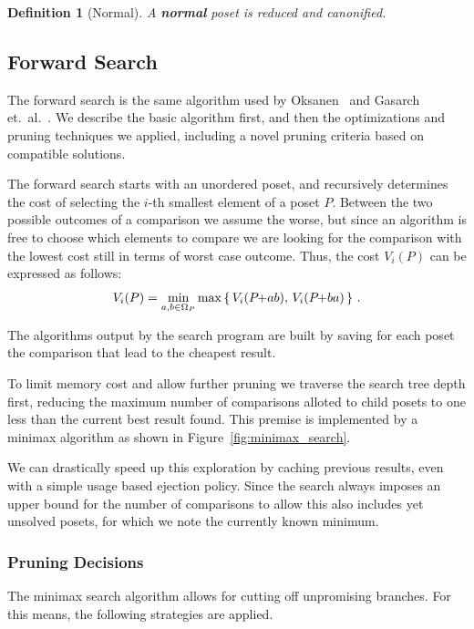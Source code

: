 \documentclass[twoside,leqno,twocolumn]{article}
\newcommand{\pchild}[3]{{#1}\kern-1pt{+}{#2}{#3}}
\newtheorem{definition}{Definition}[section]
\begin{document}
\begin{definition}[Normal]
  A \textbf{normal} poset is reduced and canonified.
\end{definition}


\subsection{Forward Search}\label{chapter:forward_search}
The forward search is the same algorithm used by Oksanen~\cite{Oksanen2006} and Gasarch et.\ al\@.~\cite{Gasarch1996}.
We describe the basic algorithm first, and then the optimizations and pruning techniques we applied, including a novel pruning criteria based on compatible solutions.

The forward search starts with an unordered poset, and recursively determines the cost of selecting the $i$-th smallest element of a poset $P$.
Between the two possible outcomes of a comparison we assume the worse, but since an algorithm is free to choose which elements to compare we are looking for the comparison with the lowest cost still in terms of worst case outcome.
Thus, the cost $V_i(P)$ can be expressed as follows:
\begin{equation}
  V_i(P) = \min_{a,b \in \Omega_P} \max \left\{ \,V_i(\pchild{P}{a}{b}),\, V_i(\pchild{P}{b}{a})\,\right\}\,\text{.}
\end{equation}

The algorithms output by the search program are built by saving for each poset the comparison that lead to the cheapest result.

To limit memory cost and allow further pruning we traverse the search tree depth first, reducing the maximum number of comparisons alloted to child posets to one less than the current best result found.
This premise is implemented by a minimax algorithm as shown in Figure~\ref{fig:minimax_search}.

We can drastically speed up this exploration by caching previous results, even with a simple usage based ejection policy. Since the search always imposes an upper bound for the number of comparisons to allow this also includes yet unsolved posets, for which we note the currently known minimum.

\subsubsection{Pruning Decisions} %
The minimax search algorithm allows for cutting off unpromising branches.
For this means, the following strategies are applied.
\end{document}
